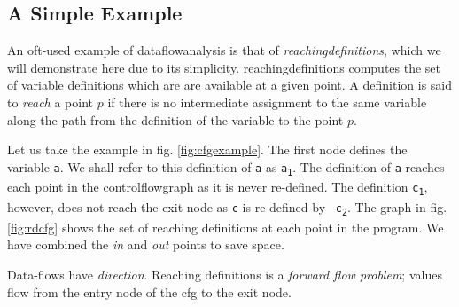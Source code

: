 \documentclass[bsc,twoside,singlespacing,parskip,logo,notimes,normalheadings]{infthesis}
\begin{document}
	\subsection{A Simple Example}\label{sec:simpleexample}
	An oft-used example of \gls{dataflowanalysis} is that of {\em
          \gls{reachingdefinition}s}, which we will demonstrate here
        due to its simplicity. \Gls{reachingdefinition}s computes the
        set of variable definitions which are are available at a given
        point. A definition is said to {\em reach} a point $p$ if
        there is no intermediate assignment to the same variable along
        the path from the definition of the variable to the point $p$.
        
        Let us take the example in fig. \ref{fig:cfgexample}. The first
        node defines the variable {\tt a}. We shall refer to this
        definition of {\tt a} as {\tt a\textsubscript{1}}. The
        definition of {\tt a} reaches each point in the
        \gls{controlflowgraph} as it is never re-defined. The
        definition {\tt c\textsubscript{1}}, however, does not reach
        the exit node as {\tt c} is re-defined by {\tt
          c\textsubscript{2}}. The graph in fig. \ref{fig:rdcfg} shows the
        set of reaching definitions at each point in the program. We
        have combined the {\em in} and {\em out} points to save space.
                
        Data-flows have {\em direction}. Reaching definitions is a
        {\em forward flow problem}; values flow from the entry node of
        the \gls{cfg} to the exit node.
\end{document}
